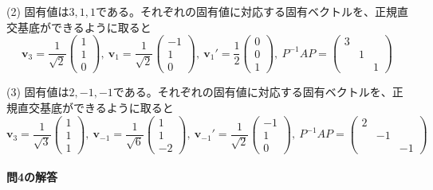 \noindent (2) 固有値は$3, 1, 1$である。それぞれの固有値に対応する固有ベクトルを、正規直交基底ができるように取ると
\[
\bm{v}_{3} =
\frac{1}{\sqrt{2}}
\begin{pmatrix}
1 \\
1 \\
0
\end{pmatrix}, \ 
\bm{v}_{1} =
\frac{1}{\sqrt{2}}
\begin{pmatrix}
-1 \\
1 \\
0
\end{pmatrix}, \ 
\bm{v}_{1}' =
\frac{1}{2}
\begin{pmatrix}
0 \\
0 \\
1
\end{pmatrix}, \ 
P^{-1} A P 
= 
\begin{pmatrix}
3 \\
& 1 \\
& & 1
\end{pmatrix}
\]

\noindent (3) 固有値は$2, -1, -1$である。それぞれの固有値に対応する固有ベクトルを、正規直交基底ができるように取ると %
\[
\bm{v}_{3} =
\frac{1}{\sqrt{3}}
\begin{pmatrix}
1 \\
1 \\
1
\end{pmatrix}, \ 
\bm{v}_{-1} =
\frac{1}{\sqrt{6}}
\begin{pmatrix}
1 \\
1 \\
-2
\end{pmatrix}, \ 
\bm{v}_{-1}' =
\frac{1}{\sqrt{2}}
\begin{pmatrix}
-1 \\
1 \\
0
\end{pmatrix}, \ 
P^{-1} A P 
= 
\begin{pmatrix}
2 \\
& -1 \\
& & -1
\end{pmatrix}
\]

\paragraph{問4の解答}

